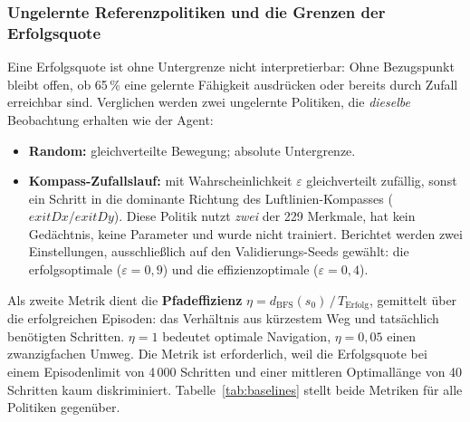 \documentclass[11pt,a4paper]{article}
\begin{document}
\subsubsection{Ungelernte Referenzpolitiken und die Grenzen der Erfolgsquote}
\label{sec:baselines}

Eine Erfolgsquote ist ohne Untergrenze nicht interpretierbar: Ohne Bezugspunkt
bleibt offen, ob 65\,\% eine gelernte Fähigkeit ausdrücken oder bereits durch
Zufall erreichbar sind. Verglichen werden zwei ungelernte Politiken, die
\emph{dieselbe} Beobachtung erhalten wie der Agent:

\begin{itemize}
  \item \textbf{Random:} gleichverteilte Bewegung; absolute Untergrenze.
  \item \textbf{Kompass-Zufallslauf:} mit Wahrscheinlichkeit $\varepsilon$
        gleichverteilt zufällig, sonst ein Schritt in die dominante Richtung des
        Luftlinien-Kompasses ($\mathit{exitDx}/\mathit{exitDy}$). Diese Politik
        nutzt \emph{zwei} der 229 Merkmale, hat kein Gedächtnis, keine
        Parameter und wurde nicht trainiert. Berichtet werden zwei
        Einstellungen, ausschließlich auf den Validierungs-Seeds gewählt: die
        erfolgsoptimale ($\varepsilon = 0{,}9$) und die effizienzoptimale
        ($\varepsilon = 0{,}4$).
\end{itemize}

Als zweite Metrik dient die \textbf{Pfadeffizienz}
$\eta = d_{\mathrm{BFS}}(s_0)\,/\,T_{\mathrm{Erfolg}}$, gemittelt über die
erfolgreichen Episoden: das Verhältnis aus kürzestem Weg und tatsächlich
benötigten Schritten. $\eta = 1$ bedeutet optimale Navigation, $\eta = 0{,}05$
einen zwanzigfachen Umweg. Die Metrik ist erforderlich, weil die Erfolgsquote
bei einem Episodenlimit von 4\,000 Schritten und einer mittleren Optimallänge
von 40 Schritten kaum diskriminiert. Tabelle~\ref{tab:baselines} stellt beide
Metriken für alle Politiken gegenüber.
\end{document}
